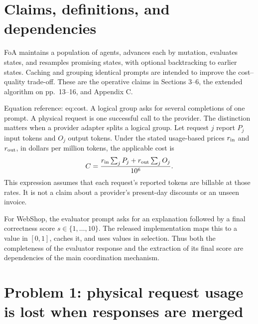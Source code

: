 \documentclass[10pt]{article}
\begin{document}
\section*{Claims, definitions, and dependencies}
FoA maintains a population of agents, advances each by mutation, evaluates states, and resamples promising states, with optional backtracking to earlier states. Caching and grouping identical prompts are intended to improve the cost–quality trade-off. These are the operative claims in Sections 3–6, the extended algorithm on pp. 13–16, and Appendix C.\par
Equation reference: eq:cost. A logical group asks for several completions of one prompt. A physical request is one successful call to the provider. The distinction matters when a provider adapter splits a logical group. Let request \(j\) report \(P_j\) input tokens and \(O_j\) output tokens. Under the stated usage-based prices \(r_{\rm in}\) and \(r_{\rm out}\), in dollars per million tokens, the applicable cost is \[
 C=\frac{r_{\rm in}\sum_jP_j+r_{\rm out}\sum_jO_j}{10^6}.\] This expression assumes that each request’s reported tokens are billable at those rates. It is not a claim about a provider’s present-day discounts or an unseen invoice.\par
For WebShop, the evaluator prompt asks for an explanation followed by a final correctness score \(s\in\{1,\ldots,10\}\). The released implementation maps this to a value in \([0,1]\), caches it, and uses values in selection. Thus both the completeness of the evaluator response and the extraction of its final score are dependencies of the main coordination mechanism.\par
\section*{Problem 1: physical request usage is lost when responses are merged}
\end{document}
